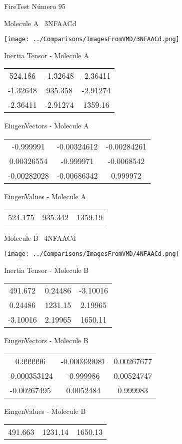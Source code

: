 \vtab[-3cm]
\begin{center}
{\large FireTest \tab Número 95}
\end{center}
\begin{multicols}{2}
\begin{center}

Molecule A \
3NFAACd

\texttt{[image: ../Comparisons/ImagesFromVMD/3NFAACd.png]}

Inertia Tensor - Molecule A \\
\begin{tabular}{|c c c|}
524.186	 & 	-1.32648	 & 	-2.36411	 \\
-1.32648	 & 	935.358	 & 	-2.91274	 \\
-2.36411	 & 	-2.91274	 & 	1359.16
\end{tabular}

\vtab
 EingenVectors - Molecule A     \\
\begin{tabular}{|c c c|}
-0.999991	 & 	-0.00324612	 & 	-0.00284261	 \\
0.00326554	 & 	-0.999971	 & 	-0.0068542	 \\
-0.00282028	 & 	-0.00686342	 & 	0.999972
\end{tabular}

\vtab
 EingenValues - Molecule A     \\
\begin{tabular}{|c c c|}
524.175	 & 	935.342	 & 	1359.19	 \\
\end{tabular}
\columnbreak

Molecule B \
4NFAACd

\texttt{[image: ../Comparisons/ImagesFromVMD/4NFAACd.png]}

Inertia Tensor - Molecule B \\
\begin{tabular}{|c c c|}
491.672	 & 	0.24486	 & 	-3.10016	 \\
0.24486	 & 	1231.15	 & 	2.19965	 \\
-3.10016	 & 	2.19965	 & 	1650.11
\end{tabular}

\vtab
 EingenVectors - Molecule B     \\
\begin{tabular}{|c c c|}
0.999996	 & 	-0.000339081	 & 	0.00267677	 \\
-0.000353124	 & 	-0.999986	 & 	0.00524747	 \\
-0.00267495	 & 	0.0052484	 & 	0.999983
\end{tabular}

\vtab
 EingenValues - Molecule B     \\
\begin{tabular}{|c c c|}
491.663	 & 	1231.14	 & 	1650.13	 \\
\end{tabular}

\end{center}
\end{multicols}

